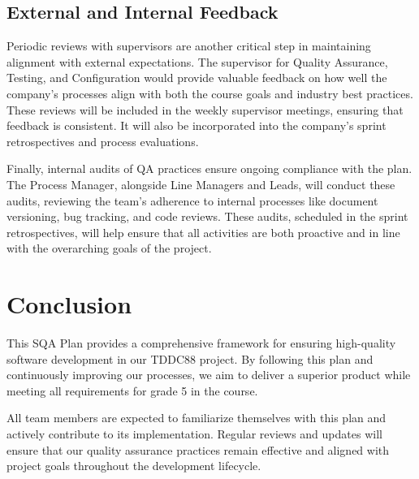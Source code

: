 \documentclass{article}
\begin{document}
\subsection{External and Internal Feedback}
Periodic reviews with supervisors are another critical step in maintaining alignment with external expectations. The supervisor for Quality Assurance, Testing, and Configuration would provide valuable feedback on how well the company's processes align with both the course goals and industry best practices. These reviews will be included in the weekly supervisor meetings, ensuring that feedback is consistent. It will also be incorporated into the company’s sprint retrospectives and process evaluations.

Finally, internal audits of QA practices ensure ongoing compliance with the plan. The Process Manager, alongside Line Managers and Leads, will conduct these audits, reviewing the team's adherence to internal processes like document versioning, bug tracking, and code reviews. These audits, scheduled in the sprint retrospectives, will help ensure that all activities are both proactive and in line with the overarching goals of the project. 

\newpage
\section{Conclusion}
This SQA Plan provides a comprehensive framework for ensuring high-quality software development in our TDDC88 project. By following this plan and continuously improving our processes, we aim to deliver a superior product while meeting all requirements for grade 5 in the course.

All team members are expected to familiarize themselves with this plan and actively contribute to its implementation. Regular reviews and updates will ensure that our quality assurance practices remain effective and aligned with project goals throughout the development lifecycle.
\end{document}
